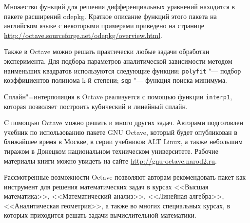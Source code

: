 \documentclass[10pt, a5paper]{article}
\begin{document}
Множество функций для решения дифференциальных уравнений находится в пакете расширений odepkg. Краткое описание функций этого пакета на английском языке с некоторыми примерами приведено на странице \url{http://octave.sourceforge.net/odepkg/overview.html}.

Также в Octave можно решать практически любые задачи обработки эксперимента. Для подбора параметров аналитической зависимости методом наименьших квадратов используются следующие функции: \verb!polyfit! "--- подбор коэффициентов полинома k-й степени; \verb!sqp! "--- функция поиска минимума.

Сплайн"=интерполяция в Octave реализуется с помощью функции \verb!interp1!, которая позволяет  построить кубический и линейный сплайн.

C помощью Octave можно решать и много других задач. Авторами подготовлен учебник по использованию пакете GNU Octave, который будет опубликован в ближайшее время в Москве, в серии учебников ALT Linux, а также небольшим тиражом в Донецком национальном техническом университете. Рабочие материалы книги можно увидеть на сайте \url{http://gnu-octave.narod2.ru}.

Рассмотренные возможности Octave позволяют авторам рекомендовать пакет как инструмент для решения математических задач в курсах <<Высшая математика>>, <<Математический анализ>>, <<Линейная алгебра>>, <<Аналитическая геометрия>>, а также во многих специальных курсах, в которых приходится решать задачи вычислительной математики.
\end{document}
